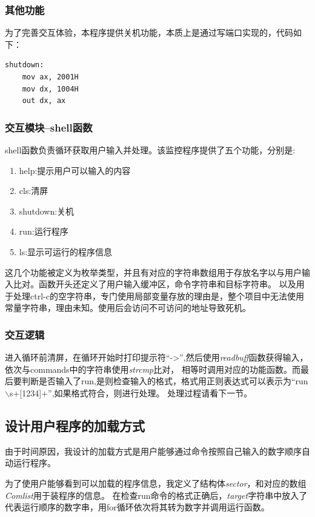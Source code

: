 \documentclass[a4paper, 11pt]{article} %
\begin{document}
\subsubsection{其他功能}
为了完善交互体验，本程序提供关机功能，本质上是通过写端口实现的，代码如下：

\begin{lstlisting}[language={[x86masm]Assembler},caption=强制关机]
shutdown:
    mov ax, 2001H
    mov dx, 1004H
    out dx, ax
  \end{lstlisting}
  

\subsubsection{交互模块--shell函数}

shell函数负责循环获取用户输入并处理。该监控程序提供了五个功能，分别是:
\begin{enumerate}
  \item help:提示用户可以输入的内容
  \item cls:清屏
  \item shutdown:关机
  \item run:运行程序
  \item ls:显示可运行的程序信息
\end{enumerate}
这几个功能被定义为枚举类型，并且有对应的字符串数组用于存放名字以与用户输入比对。函数开头还定义了用户输入缓冲区，命令字符串和目标字符串。
以及用于处理ctrl-c的空字符串，专门使用局部变量存放的理由是，整个项目中无法使用常量字符串，理由未知。使用后会访问不可访问的地址导致死机。

\subsubsection{交互逻辑}
进入循环前清屏，在循环开始时打印提示符“->”,然后使用\textit{readbuff}函数获得输入，依次与commands中的字符串使用\textit{strcmp}比对，
相等时调用对应的功能函数。而最后要判断是否输入了run,是则检查输入的格式，格式用正则表达式可以表示为“run$\backslash$s+[1234]+”,如果格式符合，则进行处理。
处理过程请看下一节。


\subsection{设计用户程序的加载方式}
由于时间原因，我设计的加载方式是用户能够通过命令按照自己输入的数字顺序自动运行程序。

为了使用户能够看到可以加载的程序信息，我定义了结构体\textit{sector}，和对应的数组\textit{Comlist}用于装程序的信息。
在检查run命令的格式正确后，\textit{target}字符串中放入了代表运行顺序的数字串，用for循环依次将其转为数字并调用运行函数。
\end{document}
